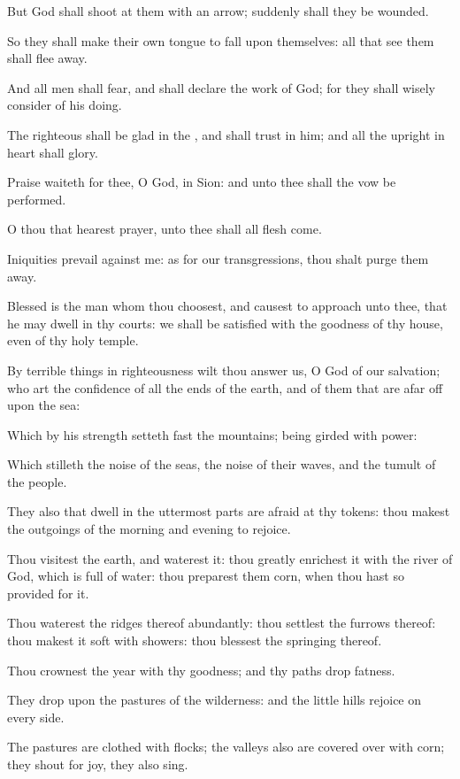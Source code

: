 \Verse But God shall shoot at them with an arrow; suddenly shall they be wounded.

\Verse So they shall make their own tongue to fall upon themselves: all that see them shall flee away.

\Verse And all men shall fear, and shall declare the work of God; for they shall wisely consider of his doing.

\Verse The righteous shall be glad in the \LORD, and shall trust in him; and all the upright in heart shall glory.




\Chapter
\Verse Praise waiteth for thee, O God, in Sion: and unto thee shall the vow be performed.

\Verse O thou that hearest prayer, unto thee shall all flesh come.

\Verse Iniquities prevail against me: as for our transgressions, thou shalt purge them away.

\Verse Blessed is the man whom thou choosest, and causest to approach unto thee, that he may dwell in thy courts: we shall be satisfied with the goodness of thy house, even of thy holy temple.

\Verse By terrible things in righteousness wilt thou answer us, O God of our salvation; who art the confidence of all the ends of the earth, and of them that are afar off upon the sea:

\Verse Which by his strength setteth fast the mountains; being girded with power:

\Verse Which stilleth the noise of the seas, the noise of their waves, and the tumult of the people.

\Verse They also that dwell in the uttermost parts are afraid at thy tokens: thou makest the outgoings of the morning and evening to rejoice.

\Verse Thou visitest the earth, and waterest it: thou greatly enrichest it with the river of God, which is full of water: thou preparest them corn, when thou hast so provided for it.

\Verse Thou waterest the ridges thereof abundantly: thou settlest the furrows thereof: thou makest it soft with showers: thou blessest the springing thereof.

\Verse Thou crownest the year with thy goodness; and thy paths drop fatness.

\Verse They drop upon the pastures of the wilderness: and the little hills rejoice on every side.

\Verse The pastures are clothed with flocks; the valleys also are covered over with corn; they shout for joy, they also sing.




